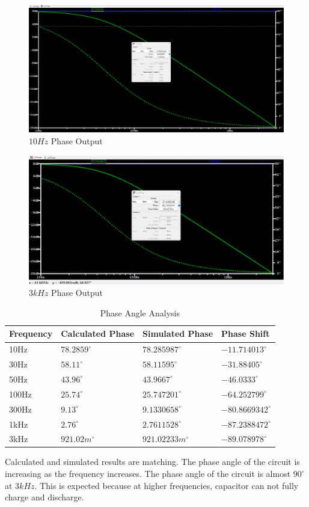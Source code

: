 \begin{figure}[h]
    \centering
        \includegraphics[width=0.6\linewidth]{assets/pd-10.png}
        \caption{$10Hz$ Phase Output}
        \label{fig:p2-10}
\end{figure}

\begin{figure}[h]
    \centering
        \includegraphics[width=0.6\linewidth]{assets/pd-3k.png}
        \caption{$3kHz$ Phase Output}
        \label{fig:p2-3k}
\end{figure}

\begin{table}[h]
    \centering
    \begin{tabular}{|l|l|l|l|}
        \hline
        \textbf{Frequency} & \textbf{Calculated Phase} & \textbf{Simulated Phase} & \textbf{Phase Shift} \\ \hline
        10Hz                 & $78.2859^{\circ}$           & $78.285987^{\circ}$      & $-11.714013   ^{\circ}$                          \\ \hline
        30Hz                 & $58.11^{\circ}$             & $58.11595^{\circ}$       & $-31.88405    ^{\circ}$                      \\ \hline
        50Hz                 & $43.96^{\circ}$             & $43.9667^{\circ}$        & $-46.0333     ^{\circ}$                  \\ \hline
        100Hz                & $25.74^{\circ}$             & $25.747201^{\circ}$      & $-64.252799   ^{\circ}$                      \\ \hline
        300Hz                & $9.13^{\circ}$              & $9.1330658^{\circ}$      & $-80.8669342  ^{\circ}$                       \\ \hline
        1kHz                 & $2.76^{\circ}$              & $2.7611528^{\circ}$      & $-87.2388472  ^{\circ}$                     \\ \hline
        3kHz                 & $921.02m^{\circ}$           & $921.02233m^{\circ}$     & $-89.078978   ^{\circ}$                    \\ \hline
    \end{tabular}
    \caption{Phase Angle Analysis}
\end{table}

Calculated and simulated results are matching. The phase angle of the circuit is increasing as the frequency increases. The phase angle of the circuit is almost $90^{\circ}$ at $3kHz$. This is expected because at higher frequencies, capacitor can not fully charge and discharge.


